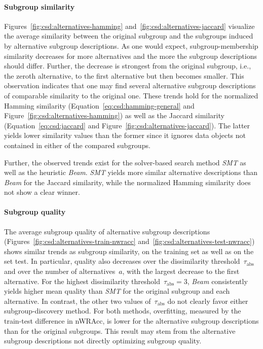 \documentclass[acmsmall]{acmart} %
\theoremstyle{acmplain}
\theoremstyle{acmdefinition}
\begin{document}
\paragraph{Subgroup similarity}

Figures~\ref{fig:csd:alternatives-hamming} and~\ref{fig:csd:alternatives-jaccard} visualize the average similarity between the original subgroup and the subgroups induced by alternative subgroup descriptions.
As one would expect, subgroup-membership similarity decreases for more alternatives and the more the subgroup descriptions should differ.
Further, the decrease is strongest from the original subgroup, i.e., the zeroth alternative, to the first alternative but then becomes smaller.
This observation indicates that one may find several alternative subgroup descriptions of comparable similarity to the original one. 
These trends hold for the normalized Hamming similarity (Equation~\ref{eq:csd:hamming-general} and Figure~\ref{fig:csd:alternatives-hamming}) as well as the Jaccard similarity (Equation~\ref{eq:csd:jaccard} and Figure~\ref{fig:csd:alternatives-jaccard}).
The latter yields lower similarity values than the former since it ignores data objects not contained in either of the compared subgroups.

Further, the observed trends exist for the solver-based search method \emph{SMT} as well as the heuristic \emph{Beam}.
\emph{SMT} yields more similar alternative descriptions than \emph{Beam} for the Jaccard similarity, while the normalized Hamming similarity does not show a clear winner.

\paragraph{Subgroup quality}

The average subgroup quality of alternative subgroup descriptions (Figures~\ref{fig:csd:alternatives-train-nwracc} and~\ref{fig:csd:alternatives-test-nwracc}) shows similar trends as subgroup similarity, on the training set as well as on the set test.
In particular, quality also decreases over the dissimilarity threshold~$\tau_{\text{abs}}$ and over the number of alternatives~$a$, with the largest decrease to the first alternative.
For the highest dissimilarity threshold~$\tau_{\text{abs}} = 3$, \emph{Beam} consistently yields higher mean quality than \emph{SMT} for the original subgroup and each alternative.
In contrast, the other two values of~$\tau_{\text{abs}}$ do not clearly favor either subgroup-discovery method.
For both methods, overfitting, measured by the train-test difference in nWRAcc, is lower for the alternative subgroup descriptions than for the original subgroups.
This result may stem from the alternative subgroup descriptions not directly optimizing subgroup quality.
\end{document}
